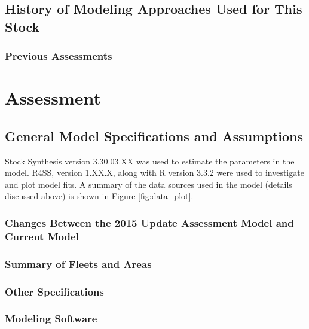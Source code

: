 \documentclass[12pt,]{article}
\begin{document}
\subsection{History of Modeling Approaches Used for This
Stock}\label{history-of-modeling-approaches-used-for-this-stock}

\subsubsection{Previous Assessments}\label{previous-assessments}

\section{Assessment}\label{assessment}

\subsection{General Model Specifications and
Assumptions}\label{general-model-specifications-and-assumptions}

Stock Synthesis version 3.30.03.XX was used to estimate the parameters
in the model. R4SS, version 1.XX.X, along with R version 3.3.2 were used
to investigate and plot model fits. A summary of the data sources used
in the model (details discussed above) is shown in Figure
\ref{fig:data_plot}.

\subsubsection{Changes Between the 2015 Update Assessment Model and
Current
Model}\label{changes-between-the-2015-update-assessment-model-and-current-model}

\subsubsection{Summary of Fleets and
Areas}\label{summary-of-fleets-and-areas}

\subsubsection{Other Specifications}\label{other-specifications}

\subsubsection{Modeling Software}\label{modeling-software}
\end{document}
